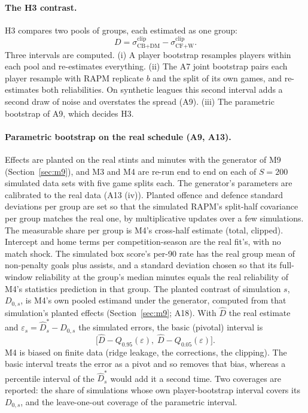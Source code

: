 \documentclass[11pt,a4paper]{article}
\begin{document}
\paragraph{The H3 contrast.}
H3 compares two pools of groups, each estimated as one group:
\begin{equation}
  D = \sigma^{\text{clip}}_{\text{CB+DM}} - \sigma^{\text{clip}}_{\text{CF+W}} .
  \label{eq:contrast}
\end{equation}
Three intervals are computed. (i) A player bootstrap resamples players within
each pool and re-estimates everything. (ii) The A7 joint bootstrap pairs each
player resample with RAPM replicate $b$ and the split of its own games, and
re-estimates both reliabilities. On synthetic leagues this second interval
adds a second draw of noise and overstates the spread (A9). (iii) The
parametric bootstrap of A9, which decides H3.

\paragraph{Parametric bootstrap on the real schedule (A9, A13).}
Effects are planted on the real stints and minutes with the generator of M9
(Section~\ref{sec:m9}), and M3 and M4 are re-run end to end on each of $S = 200$
simulated data sets with five game splits each. The generator's parameters are
calibrated to the real data (A13 (iv)). Planted offence and defence standard
deviations per group are set so that the simulated RAPM's split-half
covariance per group matches the real one, by multiplicative updates over a
few simulations. The measurable share per group is M4's cross-half estimate
(total, clipped). Intercept and home terms per competition-season are the real
fit's, with no match shock. The simulated box score's per-90 rate has the real
group mean of non-penalty goals plus assists, and a standard deviation chosen
so that its full-window reliability at the group's median minutes equals the
real reliability of M4's statistics prediction in that group. The planted
contrast of simulation $s$, $D_{0,s}$, is M4's own pooled estimand under the
generator, computed from that simulation's planted effects
(Section~\ref{sec:m9}; A18). With $\hat D$ the real estimate and
$\varepsilon_s = \hat D^\ast_s - D_{0,s}$ the simulated errors, the basic
(pivotal) interval is
\begin{equation}
  \big[\hat D - Q_{0.95}(\varepsilon),\; \hat D - Q_{0.05}(\varepsilon)\big].
  \label{eq:basic}
\end{equation}
M4 is biased on finite data (ridge leakage, the corrections, the clipping).
The basic interval treats the error as a pivot and so removes that bias,
whereas a percentile interval of the $\hat D^\ast_s$ would add it a second time.
Two coverages are reported: the share of simulations whose own player-bootstrap
interval covers its $D_{0,s}$, and the leave-one-out coverage of the parametric
interval.
\end{document}
